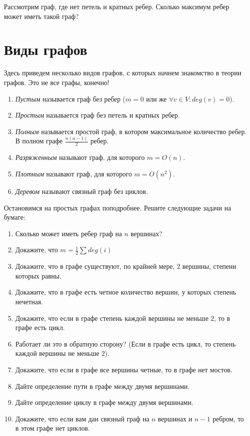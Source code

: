 \documentclass{article}
\begin{document}
Рассмотрим граф, где нет петель и кратных ребер. Сколько максимум ребер может иметь такой граф? 

\section{Виды графов}

Здесь приведем несколько видов графов, с которых начнем знакомство в теории графов. Это не все графы, конечно!

\begin{enumerate}
    \item \textit{Пустым} называется граф без ребер ($m=0$ или же $\forall v \in V : deg(v) = 0$).
    \item \textit{Простым} называется граф без петель и кратных ребер.
    \item \textit{Полным} называется простой граф, в котором максимальное количество ребер. В полном графе $\frac{n(n-1)}{2}$ ребер.
    \item \textit{Разряженным} называют граф, для которого $m = O(n)$.
    \item \textit{Плотным} называют граф, для которого $m = O(n^2)$.
    \item \textit{Деревом} называют связный граф без циклов.  
\end{enumerate}

Остановимся на простых графах поподробнее. Решите следующие задачи на бумаге:

\begin{enumerate}
    \item Сколько может иметь ребер граф на $n$ вершинах?
    \item Докажите, что $m = \frac{1}{2} \sum deg(i)$
    \item Докажите, что в графе существуют, по крайней мере, $2$ вершины, степени
    которых равны.
    \item Докажите, что в графе есть четное количество вершин, у которых степень нечетная. 
    \item Докажите, что если в графе степень каждой вершины не меньше $2$, то в графе есть цикл.
    \item Работает ли это в обратную сторону? (Если в графе есть цикл, то степень каждой вершины не меньше $2$).
    \item Докажите, что если в графе все вершины четные, то в графе нет мостов.
    \item Дайте определение пути в графе между двумя вершинами. 
    \item Дайте определение циклу в графе между двумя вершинами.
    \item Докажите, что если вам дан связный граф на $n$ вершинах и $n-1$ ребром, то в этом графе нет циклов.
\end{enumerate}
\end{document}
